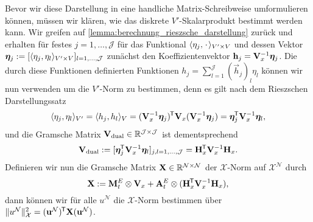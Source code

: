\documentclass[../main.tex]{subfiles}
\begin{document}
Bevor wir diese Darstellung in eine handliche Matrix-Schreibweise umformulieren können, müssen wir klären, wie das diskrete $V'$-Skalarprodukt bestimmt werden kann.
Wir greifen auf \cref{lemma:berechnung_rieszsche_darstellung} zurück und erhalten für festes $j = 1, \dots, \mathcal J$ für das Funktional $\langle\eta_{j},{\mkern2mu\cdot\mkern2mu}\rangle_{V' \times V}$ und dessen Vektor $\bm \eta_{j} := [\langle\eta_{j},\eta_{l}\rangle_{V' \times V}]_{l = 1, \dots, \mathcal J}$ zunächst den Koeffizientenvektor $\mathbf{h}_{j} = \mathbf{V}_{x}^{-1} \bm \eta_{j}$.
Die durch diese Funktionen definierten Funktionen $h_{j} = \sum_{l = 1}^{\mathcal J} (\vec{h}_{j})_{l} \eta_{l}$ können wir nun verwenden um die $V'$-Norm zu bestimmen, denn es gilt nach dem Rieszschen Darstellungssatz
\begin{equation}
    \langle\eta_{j},\eta_{l}\rangle_{V'} = \langle h_{j},h_{l}\rangle_{V} = (\mathbf{V}_{x}^{-1} \bm \eta_{j})^{\mkern-1.5mu\mathsf{T}} \mathbf{V}_{x} (\mathbf{V}_{x}^{-1} \bm \eta_{j}) = \bm{\eta}_{j}^{\mkern-1.5mu\mathsf{T}} \mathbf{V}_{x}^{-1} \bm{\eta}_{l},
\end{equation}
und die Gramsche Matrix $\mathbf{V}_{\mathrm{dual}} \in \mathbb{R}^{\mathcal J \times \mathcal J}$ ist dementsprechend
\begin{equation}
    \mathbf{V}_{\mathrm{dual}} := [\bm{\eta}_{j}^{\mkern-1.5mu\mathsf{T}} \mathbf{V}_{x}^{-1} \bm{\eta}_{l}]_{j,l = 1, \dots, \mathcal J} = \mathbf{H}_{x}^{\mkern-1.5mu\mathsf{T}} \mathbf{V}_{x}^{-1} \mathbf{H}_{x}.
\end{equation}
Definieren wir nun die Gramsche Matrix $\mathbf{X} \in \mathbb{R}^{\mathcal N \times \mathcal N}$ der $\mathcal X$-Norm auf $\mathcal X^{\mathcal N}$ durch
\begin{equation}
    \mathbf{X} := \mathbf{M}^{E}_{t} \otimes \mathbf{V}_{x} + \mathbf{A}^{E}_{t} \otimes (\mathbf{H}_{x}^{\mkern-1.5mu\mathsf{T}} \mathbf{V}_{x}^{-1} \mathbf{H}_{x}),
\end{equation}
dann können wir für alle $u^{\mathcal N}$ die $\mathcal X$-Norm bestimmen über $\lVert u^{\mathcal N}\rVert_{\mathcal X}^{2} = (\mathbf{u}^{\mathcal N})^{\mkern-1.5mu\mathsf{T}} \mathbf{X} (\mathbf{u}^{\mathcal N})$.
\end{document}

